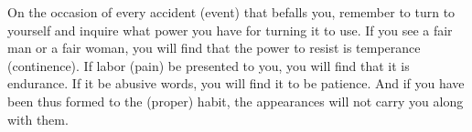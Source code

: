 On the occasion of every accident (event) that befalls you, remember to turn to
yourself and inquire  what power you have for  turning it to use. If  you see a
fair man or a fair woman, you will  find that the power to resist is temperance
(continence). If  labor (pain) be  presented to you, you  will find that  it is
endurance. If it be abusive words, you will  find it to be patience. And if you
have been thus formed to the (proper) habit, the appearances will not carry you
along with them.

